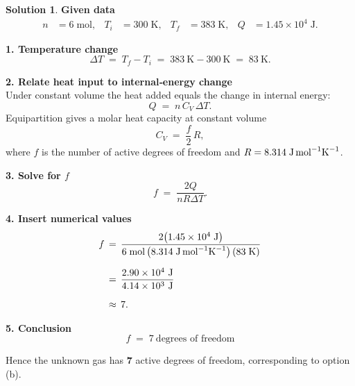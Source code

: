 \documentclass[12pt]{article}
\title{}
\author{Jerich Lee}
\date{\today}
\theoremstyle{definition} %
\newtheorem{solution}{Solution}
\theoremstyle{plain} %
\begin{document}
\maketitle
\begin{solution}
  \textbf{Given data}\\
  \begin{align*}
  n &= 6 \;\text{mol}, &
  T_i &= 300 \;\text{K}, &
  T_f &= 383 \;\text{K}, &
  Q &= 1.45\times 10^{4}\;\text{J}.
  \end{align*}
  
  \textbf{1. Temperature change}\\
  \[
  \Delta T \;=\; T_f - T_i \;=\; 383\ \text{K} - 300\ \text{K} \;=\; 83\ \text{K}.
  \]
  
  \textbf{2. Relate heat input to internal‐energy change}\\
  Under constant volume the heat added equals the change in internal energy:
  \[
  Q \;=\; n\,C_V\,\Delta T.
  \]
  Equipartition gives a molar heat capacity at constant volume
  \[
  C_V \;=\; \frac{f}{2}\,R,
  \]
  where \(f\) is the number of active degrees of freedom and \(R = 8.314\;\text{J\,mol}^{-1}\text{K}^{-1}\).
  
  \textbf{3. Solve for \(f\)}\\
  \[
  f \;=\; \frac{2Q}{n R \Delta T}.
  \]
  
  \textbf{4. Insert numerical values}\\
  \begin{align*}
  f &\,=\, \frac{2\bigl(1.45\times10^{4}\;\text{J}\bigr)}
                 {6\;\text{mol}\,\bigl(8.314\;\text{J\,mol}^{-1}\text{K}^{-1}\bigr)\,(83\;\text{K})} \\[6pt]
    &\,=\, \frac{2.90\times10^{4}\ \text{J}}
                 {4.14\times10^{3}\ \text{J}} \\[6pt]
    &\,\approx\, 7.
  \end{align*}
  
  \textbf{5. Conclusion}\\
  \[
  \boxed{f \;=\; 7\ \text{degrees of freedom}}
  \]
  
  Hence the unknown gas has \(\mathbf{7}\) active degrees of freedom, corresponding to option (b).
  \end{solution}
\end{document}
